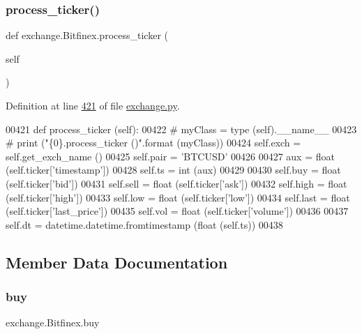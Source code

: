 \subsubsection{\texorpdfstring{process\+\_\+ticker()}{process\_ticker()}}
{\footnotesize\ttfamily def exchange.\+Bitfinex.\+process\+\_\+ticker (\begin{DoxyParamCaption}\item[{}]{self }\end{DoxyParamCaption})}



Definition at line \hyperlink{exchange_8py_source_l00421}{421} of file \hyperlink{exchange_8py_source}{exchange.\+py}.


\begin{DoxyCode}
00421     \textcolor{keyword}{def }process\_ticker (self):
00422 \textcolor{comment}{#        myClass = type (self).\_\_name\_\_}
00423 \textcolor{comment}{#        print ("\{0\}.process\_ticker ()".format (myClass))}
00424         self.exch = self.get\_exch\_name ()
00425         self.pair = \textcolor{stringliteral}{'BTCUSD'}
00426         
00427         aux       = float (self.ticker[\textcolor{stringliteral}{'timestamp'}])
00428         self.ts   = int   (aux)
00429         
00430         self.buy  = float (self.ticker[\textcolor{stringliteral}{'bid'}])
00431         self.sell = float (self.ticker[\textcolor{stringliteral}{'ask'}])
00432         self.high = float (self.ticker[\textcolor{stringliteral}{'high'}])
00433         self.low  = float (self.ticker[\textcolor{stringliteral}{'low'}])
00434         self.last = float (self.ticker[\textcolor{stringliteral}{'last\_price'}])
00435         self.vol  = float (self.ticker[\textcolor{stringliteral}{'volume'}])
00436     
00437         self.dt = datetime.datetime.fromtimestamp (float (self.ts))
00438     
\end{DoxyCode}


\subsection{Member Data Documentation}
\mbox{\label{classexchange_1_1_bitfinex_aed7ff0d2287aaf4d61985d6f11c23c98}} 
\subsubsection{\texorpdfstring{buy}{buy}}
{\footnotesize\ttfamily exchange.\+Bitfinex.\+buy}



